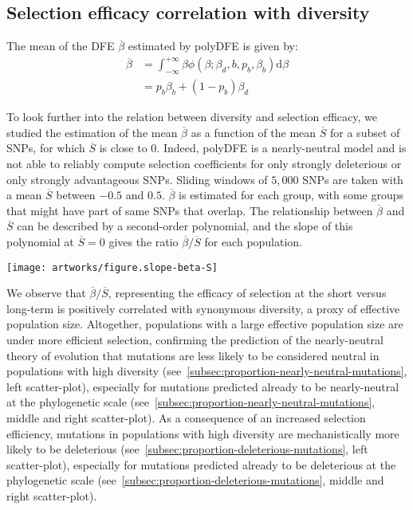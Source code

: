 \documentclass{article}
\newcommand{\der}{\mathrm{d}}
\newcommand{\Sphy}{S}
\newcommand{\SphyMean}{\overline{\Sphy}}
\newcommand{\Spop}{\beta}
\newcommand{\SpopMean}{\overline{\Spop}}
\begin{document}
    \subsection{Selection efficacy correlation with diversity}\label{subsec:selection-efficacy-correlation-with-diversity}

    The mean of the DFE $\SpopMean$ estimated by polyDFE is given by:
    \begin{align*}
        \SpopMean & = \int_{-\infty}^{+\infty} \Spop \phi \left( \Spop; \Spop_d , b, p_b, \Spop_b \right) \der \Spop \\
        & =  p_b \Spop_b + \left( 1 - p_b \right) \Spop_d
    \end{align*}

    To look further into the relation between diversity and selection efficacy, we studied the estimation of the mean $\SpopMean$ as a function of the mean $\SphyMean$ for a subset of SNPs, for which $\SphyMean$ is close to $0$.
    Indeed, polyDFE is a nearly-neutral model and is not able to reliably compute selection coefficients for only strongly deleterious or only strongly advantageous SNPs.
    Sliding windows of $5,000$ SNPs are taken with a mean $\SphyMean$ between $-0.5$ and $0.5$.
    $\SpopMean$ is estimated for each group, with some groups that might have part of same SNPs that overlap.
    The relationship between $\SpopMean$ and $\SphyMean$ can be described by a second-order polynomial, and the slope of this polynomial at $\SphyMean=0$ gives the ratio $\SpopMean/\SphyMean$ for each population.

    \begin{center}
        \texttt{[image: artworks/figure.slope-beta-S]}
    \end{center}

    We observe that $\SpopMean/\SphyMean$, representing the efficacy of selection at the short versus long-term is positively correlated with synonymous diversity, a proxy of effective population size.
    Altogether, populations with a large effective population size are under more efficient selection, confirming the prediction of the nearly-neutral theory of evolution that mutations are less likely to be considered neutral in populations with high diversity (see~\ref{subsec:proportion-nearly-neutral-mutations}, left scatter-plot), especially for mutations predicted already to be nearly-neutral at the phylogenetic scale (see~\ref{subsec:proportion-nearly-neutral-mutations}, middle and right scatter-plot).
    As a consequence of an increased selection efficiency, mutations in populations with high diversity are mechanistically more likely to be deleterious (see~\ref{subsec:proportion-deleterious-mutations}, left scatter-plot), especially for mutations predicted already to be deleterious at the phylogenetic scale (see~\ref{subsec:proportion-deleterious-mutations}, middle and right scatter-plot).
    
\end{document}
